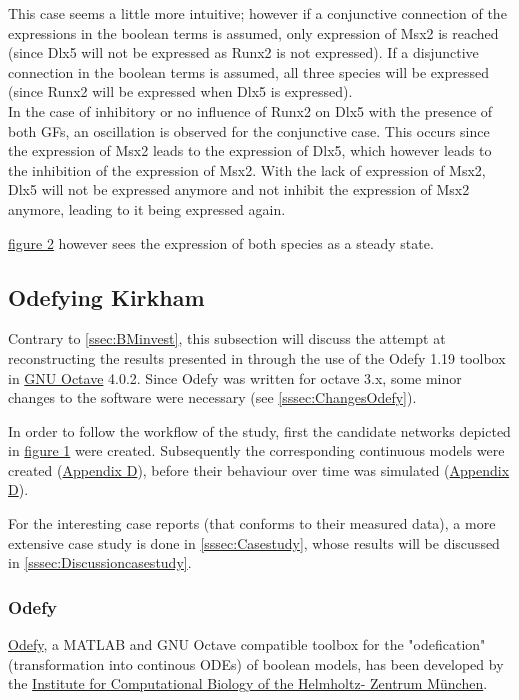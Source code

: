 \documentclass[11pt]{article}
\begin{document}
This case seems a little more intuitive; however if a conjunctive connection of the expressions in the boolean terms is assumed, only expression of Msx2 is reached (since Dlx5 will not be expressed as Runx2 is not expressed). If a disjunctive connection in the boolean terms is assumed, all three species will be expressed (since Runx2 will be expressed when Dlx5 is expressed). \\

In the case of inhibitory or no influence of Runx2 on Dlx5 with the presence of both GFs, an oscillation is observed for the conjunctive case. This occurs since the expression of Msx2 leads to the expression of Dlx5, which however leads to the inhibition of the expression of Msx2. With the lack of expression of Msx2, Dlx5 will not be expressed anymore and not inhibit the expression of Msx2 anymore, leading to it being expressed again.

\hyperref[table1]{figure 2} however sees the expression of both species as a steady state.

\subsection{Odefying Kirkham} \label{ssec:Odefyinvest}
Contrary to \ref{ssec:BMinvest}, this subsection will discuss the attempt at reconstructing the results presented in \cite{Kirkham} through the use of the Odefy 1.19 toolbox in \href{https://www.gnu.org/software/octave/}{GNU Octave}
4.0.2. Since Odefy was written for octave 3.x, some minor changes to the software were necessary (see \ref{sssec:ChangesOdefy}).

In order to follow the workflow of the study, first the candidate networks depicted in \hyperref[GRNs]{figure 1} were created. Subsequently the corresponding continuous models were created (\hyperref[sssec:Modelcreation]{Appendix D}), before their behaviour over time was simulated (\hyperref[sssec:simulationCM]{Appendix D}).

For the interesting case \cite{Kirkham} reports (that conforms to their measured data), a more extensive case study is done in \ref{sssec:Casestudy}, whose results will be discussed in \ref{sssec:Discussioncasestudy}.

\subsubsection{Odefy}
\href{http://www.helmholtz-muenchen.de/icb/software/odefy/index.html}{Odefy}, a MATLAB and GNU Octave compatible toolbox for the "odefication" (transformation into continous ODEs) of boolean models, has been developed by the \href{http://www.helmholtz-muenchen.de/icb/index.html}{Institute for Computational Biology of the Helmholtz-
Zentrum M{\"u}nchen}.
\end{document}
